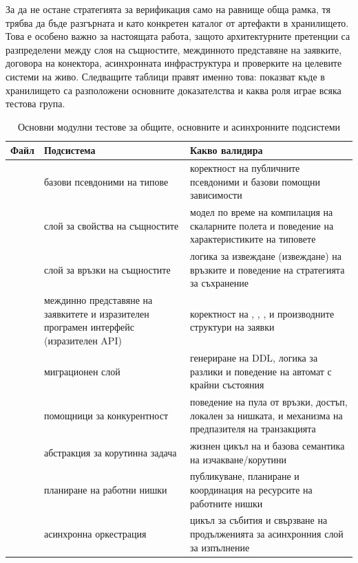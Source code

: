 За да не остане стратегията за верификация само на равнище обща рамка, тя трябва да бъде разгърната и като конкретен каталог от артефакти в хранилището. Това е особено важно за настоящата работа, защото архитектурните претенции са разпределени между слоя на същностите, междинното представяне на заявките, договора на конектора, асинхронната инфраструктура и проверките на целевите системи на живо. Следващите таблици правят именно това: показват къде в хранилището са разположени основните доказателства и каква роля играе всяка тестова група.

\begin{table}[H]
\centering
\small
\caption{Основни модулни тестове за общите, основните и асинхронните подсистеми}
\label{tab:verification_unit_core}
\begin{tabularx}{\textwidth}{L{3.2cm}L{3.8cm}Y}
\toprule
\textbf{Файл} & \textbf{Подсистема} & \textbf{Какво валидира} \\
\midrule
{} & базови псевдоними на типове & коректност на публичните псевдоними и базови помощни зависимости \\
 & слой за свойства на същностите & модел по време на компилация на скаларните полета и поведение на характеристиките на типовете \\
 & слой за връзки на същностите & логика за извеждане (извеждане) на връзките и поведение на стратегията за съхранение \\
 & междинно представяне на заявкитете и изразителен програмен интерфейс (изразителен API) & коректност на , , ,  и производните структури на заявки \\
 & миграционен слой & генериране на DDL, логика за разлики и поведение на автомат с крайни състояния \\
 & помощници за конкурентност & поведение на пула от връзки, достъп, локален за нишката, и механизма на предпазителя на транзакцията \\
 & абстракция за корутинна задача & жизнен цикъл на  и базова семантика на изчакване/корутини \\
 & планиране на работни нишки & публикуване, планиране и координация на ресурсите на работните нишки \\
 & асинхронна оркестрация & цикъл за събития и свързване на продълженията за асинхронния слой за изпълнение \\

\end{tabularx}
\end{table}
